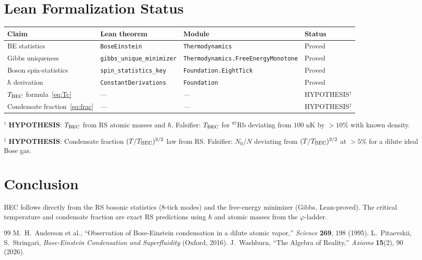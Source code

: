 \documentclass[12pt,a4paper]{article}
\theoremstyle{definition}
\theoremstyle{remark}
\begin{document}
\section{Lean Formalization Status}

\begin{center}
\begin{tabular}{llll}
\toprule
Claim & Lean theorem & Module & Status \\
\midrule
BE statistics & \texttt{BoseEinstein} & \texttt{Thermodynamics} & Proved \\
Gibbs uniqueness & \texttt{gibbs\_unique\_minimizer} & \texttt{Thermodynamics.FreeEnergyMonotone} & Proved \\
Boson spin-statistics & \texttt{spin\_statistics\_key} & \texttt{Foundation.EightTick} & Proved \\
$\hbar$ derivation & \texttt{ConstantDerivations} & \texttt{Foundation} & Proved \\
$T_{\rm BEC}$ formula~\eqref{eq:Tc} & --- & --- & HYPOTHESIS$^\dagger$ \\
Condensate fraction~\eqref{eq:frac} & --- & --- & HYPOTHESIS$^\ddagger$ \\
\bottomrule
\end{tabular}
\end{center}

$^\dagger$ \textbf{HYPOTHESIS}: $T_{\rm BEC}$ from RS atomic masses and $\hbar$. Falsifier: $T_{\rm BEC}$ for ${}^{87}$Rb deviating from $100$ nK by $> 10\%$ with known density.

$^\ddagger$ \textbf{HYPOTHESIS}: Condensate fraction $(T/T_{\rm BEC})^{3/2}$ law from RS. Falsifier: $N_0/N$ deviating from $(T/T_{\rm BEC})^{3/2}$ at $> 5\%$ for a dilute ideal Bose gas.

\section{Conclusion}

BEC follows directly from the RS bosonic statistics (8-tick modes) and
the free-energy minimizer (Gibbs, Lean-proved).  The critical temperature
and condensate fraction are exact RS predictions using $\hbar$ and atomic
masses from the $\varphi$-ladder.

\begin{thebibliography}{99}
 M.~H.~Anderson et al., ``Observation of Bose-Einstein condensation in a dilute atomic vapor,'' \textit{Science} \textbf{269}, 198 (1995).
 L.~Pitaevskii, S.~Stringari, \textit{Bose-Einstein Condensation and Superfluidity} (Oxford, 2016).
 J.~Washburn, ``The Algebra of Reality,'' \textit{Axioms} \textbf{15}(2), 90 (2026).
\end{thebibliography}
\end{document}
